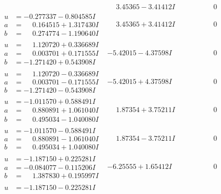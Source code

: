 \documentclass[1p]{elsarticle_modified}
\theoremstyle{definition}
\begin{document}
$$\begin{array}{c|c|c}
 & \phantom{-}3.45365 - 3.41412 I & \phantom{-0.000000 } 0 \\ \hline\begin{aligned}
u &= -0.277337 - 0.804585 I \\
a &= \phantom{-}0.164515 + 1.317430 I \\
b &= \phantom{-}0.274774 - 1.190640 I\end{aligned}
 & \phantom{-}3.45365 + 3.41412 I & \phantom{-0.000000 } 0 \\ \hline\begin{aligned}
u &= \phantom{-}1.120720 + 0.336689 I \\
a &= \phantom{-}0.003701 + 0.171555 I \\
b &= -1.271420 + 0.543908 I\end{aligned}
 & -5.42015 - 4.37598 I & \phantom{-0.000000 } 0 \\ \hline\begin{aligned}
u &= \phantom{-}1.120720 - 0.336689 I \\
a &= \phantom{-}0.003701 - 0.171555 I \\
b &= -1.271420 - 0.543908 I\end{aligned}
 & -5.42015 + 4.37598 I & \phantom{-0.000000 } 0 \\ \hline\begin{aligned}
u &= -1.011570 + 0.588491 I \\
a &= \phantom{-}0.880891 + 1.061040 I \\
b &= \phantom{-}0.495034 - 1.040080 I\end{aligned}
 & \phantom{-}1.87354 + 3.75211 I & \phantom{-0.000000 } 0 \\ \hline\begin{aligned}
u &= -1.011570 - 0.588491 I \\
a &= \phantom{-}0.880891 - 1.061040 I \\
b &= \phantom{-}0.495034 + 1.040080 I\end{aligned}
 & \phantom{-}1.87354 - 3.75211 I & \phantom{-0.000000 } 0 \\ \hline\begin{aligned}
u &= -1.187150 + 0.225281 I \\
a &= -0.084077 - 0.115206 I \\
b &= \phantom{-}1.387830 + 0.195997 I\end{aligned}
 & -6.25555 + 1.65412 I & \phantom{-0.000000 } 0 \\ \hline\begin{aligned}
u &= -1.187150 - 0.225281 I \\

\end{aligned}
\end{array}$$
\end{document}
